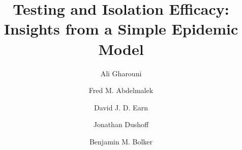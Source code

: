 \documentclass[smallextended]{svjour3}       %
\DeclareRobustCommand\_{\ifmmode\expandafter\subtxt\else\textunderscore\fi}
\begin{document}
\linenumbers

\title{Testing and Isolation Efficacy:\\Insights from a Simple Epidemic Model
}


\author{Ali Gharouni         \and
        Fred M. Abdelmalek \and 
        David J. D. Earn \and
        Jonathan Dushoff \and
        Benjamin M. Bolker
}

\end{document}
